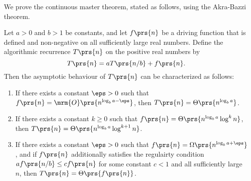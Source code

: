 \documentclass[oneside]{scrbook}
\theoremstyle{definition}
\begin{document}
\begin{exercise}
We prove the continuous master theorem, stated as follows, using the Akra-Bazzi theorem.

\begin{theorem}
Let $a>0$ and $b>1$ be constants, and let $f\prs{n}$ be a driving function that is defined and non-negative on all sufficiently large real numbers. Define the algorithmic recurrence $T\prs{n}$ on the positive real numbers by
\[T\prs{n} = aT\prs{n/b} + f\prs{n} \text{.}\]
Then the asymptotic behaviour of $T\prs{n}$ can be characterized as follows:
\begin{enumerate}
\item If there exists a constant $\eps > 0$ such that $f\prs{n} = \mrm{O}\prs{n^{\log_b a - \eps}}$, then $T\prs{n} = \Theta\prs{n^{\log_b a}}$.
\item If there exists a constant $k \geq 0$ such that $f\prs{n} = \Theta\prs{n^{\log_b a} \log^k n}$, then $T\prs{n} = \Theta\prs{n^{\log_b a} \log^{k+1} n}$.
\item If there exists a constant $\eps > 0$ such that $f\prs{n} = \Omega\prs{n^{\log_b a + \eps}}$, and if $f\prs{n}$ additionally satisfies the regulairty condition $a f\prs{n/b} \leq cf\prs{n}$ for some constant $c<1$ and all sufficiently large $n$, then $T\prs{n} = \Theta\prs{f\prs{n}}$.
\end{enumerate}
\end{theorem}


\end{exercise}
\end{document}
